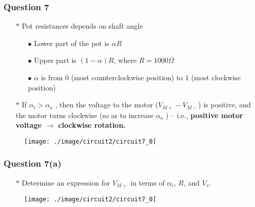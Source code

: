 \documentclass{beamer}
\begin{document}

\begin{frame}
\frametitle{Question 7}
\begin{itemize} \itemsep1pt \parskip0pt 
  \item[$\ast$] Pot resistances depends on shaft angle
  \begin{itemize} \itemsep1pt \parskip0pt 
  \item[$\bullet$] Lower part of the pot is $\alpha R$
  \item[$\bullet$] Upper part is $(1 - \alpha)R$, where $R = 1000\Omega$
  \item[$\bullet$] $\alpha$ is from $0$ (most counterclockwise position) to $1$ (most clockwise position)
  \end{itemize}
\end{itemize}

\begin{itemize} \itemsep1pt \parskip0pt 
  \item[$\ast$] If $\alpha_i > \alpha_o$ , then the voltage to the motor ($V_{M+} - V_{M-}$) is positive, and the motor turns clockwise (so as to increase $\alpha_o$ ) -- i.e., {\bf positive motor voltage $\rightarrow$ clockwise rotation.}
\end{itemize}

\begin{figure}[H]
  \centering
  \texttt{[image: ./image/circuit2/circuit7\_0]}
\end{figure}



\end{frame}


\begin{frame}
\frametitle{Question 7(a)}
\begin{itemize} \itemsep1pt \parskip0pt 
  \item[$\ast$] Determine an expression for $V_{M+}$ in terms of $\alpha_i$, $R$, and $V_s$.
\end{itemize}


\begin{figure}[H]
  \centering
  \texttt{[image: ./image/circuit2/circuit7\_0]}
\end{figure}

\end{frame}
\end{document}
